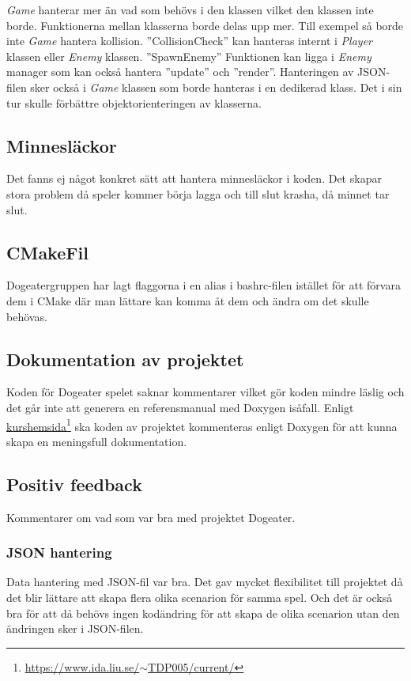 \documentclass[12pt]{TDP005mall}
\begin{document}
\textit{Game} hanterar mer än vad som behövs i den klassen vilket den klassen inte borde. Funktionerna mellan klasserna borde delas upp mer. Till exempel så borde inte \textit{Game} hantera kollision. ''CollisionCheck'' kan hanteras internt i \textit{Player} klassen eller \textit{Enemy} klassen. 
''SpawnEnemy'' Funktionen kan ligga i \textit{Enemy} manager som kan också hantera ''update'' och ''render''.
Hanteringen av JSON-filen sker också i \textit{Game} klassen som borde hanteras i en dedikerad klass. Det i sin tur skulle förbättre objektorienteringen av klasserna.

\subsection{Minnesläckor}
Det fanns ej något konkret sätt att hantera minnesläckor i koden. Det skapar stora problem då speler kommer börja lagga och till slut krasha, då minnet tar slut.

\subsection{CMakeFil}
Dogeatergruppen har lagt flaggorna i en alias i bashrc-filen istället för att förvara dem i CMake där man lättare kan komma åt dem och ändra om det skulle behövas.



\subsection{Dokumentation av projektet}
Koden för Dogeater spelet saknar kommentarer vilket gör koden mindre läslig och det går inte att generera en referensmanual med Doxygen isåfall. 
Enligt \href{https://www.ida.liu.se/~TDP005/current/}{kurshemsida}\footnote{\href{https://www.ida.liu.se/~TDP005/current/}{https://www.ida.liu.se/\(\sim\)TDP005/current/}} ska koden av projektet kommenteras enligt Doxygen för att kunna skapa en meningsfull dokumentation.


\subsection{Positiv feedback}
Kommentarer om vad som var bra med projektet Dogeater.  

\subsubsection{JSON hantering}
Data hantering med JSON-fil var bra. Det gav mycket flexibilitet till projektet då det blir lättare att skapa flera olika scenarion för samma spel. Och det är också bra för att då behövs ingen kodändring för att skapa de olika scenarion utan den ändringen sker i JSON-filen.
\end{document}
